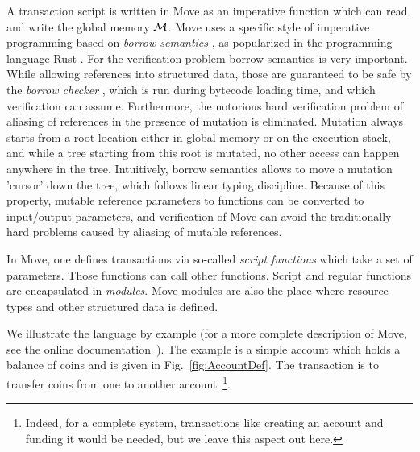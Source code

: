 A transaction script is written in Move as an imperative function which can read
and write the global memory $\mathcal{M}$. Move uses a specific style of
imperative programming based on \emph{borrow semantics} \cite{BORROW_SEM}, as
popularized in the programming language Rust \cite{RUST,RUST_TYPES}. For the
verification problem borrow semantics is very important.  While allowing
references into structured data, those are guaranteed to be safe by the
\emph{borrow checker} \cite{BORROW_CHECKER}, which is run during bytecode
loading time, and which verification can assume. Furthermore, the notorious hard
verification problem of aliasing of references in the presence of mutation is
eliminated.  Mutation always starts from a root location either in global memory
or on the execution stack, and while a tree starting from this root is mutated,
no other access can happen anywhere in the tree. Intuitively, borrow semantics
allows to move a mutation 'cursor' down the tree, which follows linear typing
discipline. Because of this property, mutable reference parameters to functions
can be converted to input/output parameters, and verification of Move can avoid
the traditionally hard problems caused by aliasing of mutable references.



In Move, one defines transactions via so-called \emph{script
  functions} which take a set of parameters.  Those functions can call other
functions. Script and regular functions are encapsulated in \emph{modules}. Move
modules are also the place where resource types and other structured data is
defined.


We illustrate the language by example (for a more complete description of Move,
see the online documentation~\cite{MOVE_LANG_DEF}). The example is a simple
account which holds a balance of coins and is given in
Fig.~\ref{fig:AccountDef}. The transaction is to transfer coins from one to
another account~\footnote{Indeed, for a complete system, transactions like
  creating an account and funding it would be needed, but we leave this aspect
  out here.}.


